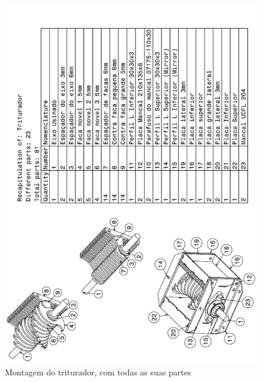 \begin{anexosenv}
\begin{figure}[!ht]
	\centering
		\includegraphics[scale=0.6]{figuras/estrutura/anexos/2.png}
	\caption{Montagem do triturador, com todas as suas partes}
\end{figure}


\end{anexosenv}
